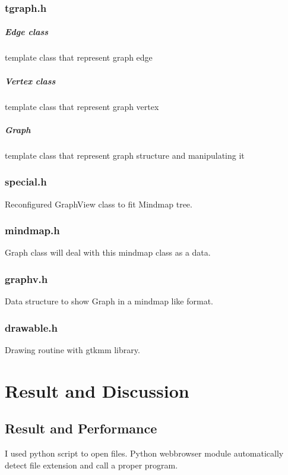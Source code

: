 \documentclass[12pt,a4paper]{report}
\begin{document}
\subsection{tgraph.h}

\paragraph{Edge class} template class that represent graph edge 
\paragraph{Vertex class} template class that represent graph vertex
\paragraph{Graph} template class that represent graph structure and manipulating it

\subsection{special.h}
Reconfigured GraphView class to fit Mindmap tree.

\subsection{mindmap.h}
Graph class will deal with this mindmap class as a data.
\subsection{graphv.h}
Data structure to show Graph in a mindmap like format.

\subsection{drawable.h}
Drawing routine with gtkmm library.
\chapter{Result and Discussion}

\section{Result and Performance}

I used python script to open files. Python webbrowser module automatically detect file extension and call a proper program.
\end{document}
